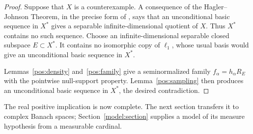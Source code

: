 \begin{proof}
Suppose that $X$ is a counterexample.  A consequence of the
Hagler--Johnson Theorem, in the precise form of
\cite[Proposition~16]{ArgyrosDodosKanellopoulos2008}, says that an
unconditional basic sequence in $X^*$ gives a separable
infinite-dimensional quotient of $X$.  Thus $X^*$ contains no such
sequence.  Choose an infinite-dimensional separable closed subspace
$E\subset X^*$.  It contains no isomorphic copy of $\ell_1$, whose usual
basis would give an unconditional basic sequence in $X^*$.

Lemmas~\ref{pos:density} and~\ref{pos:family} give a seminormalized family
$f_\alpha=h_\alpha R_E$ with the pointwise null-support property.
Lemma~\ref{pos:sampling} then produces an unconditional basic sequence in
$X^*$, the desired contradiction.
\end{proof}

The real positive implication is now complete. The next section transfers
it to complex Banach spaces; Section~\ref{model:section} supplies a model
of its measure hypothesis from a measurable cardinal.
